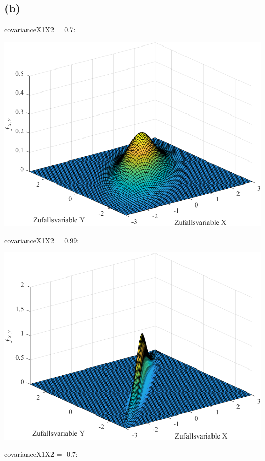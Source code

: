 \documentclass[a4paper]{scrartcl}
\begin{document}
\subsection*{(b)}

covarianceX1X2 = 0.7:
\begin{center}
	\includegraphics*[scale = 0.5]{question3b1.png}
\end{center}
covarianceX1X2 = 0.99:
\begin{center}
	\includegraphics*[scale = 0.5]{question3b2.png}
\end{center}
covarianceX1X2 = -0.7:
\end{document}
